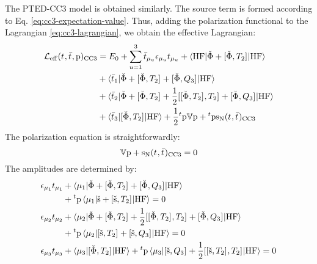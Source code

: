The \acrshort{PTED}-\acrshort{CC3} model is obtained similarly. The
source term is formed according to Eq. \eqref{eq:cc3-expectation-value}.
Thus, adding the polarization functional to the Lagrangian
\eqref{eq:cc3-lagrangian}, we obtain the effective Lagrangian:
\begin{equation}\label{eq:pted-cc3-lagrangian}
  \begin{aligned}
  \mathcal{L}_\mathrm{eff}(t_{}, \bar{t}_{}, \mathrm{p})_\mathrm{CC3}
  &=
  E_0
  + \sum_{u=1}^{3}\bar{t}_{\mu_u}\epsilon_{\mu_u}t_{\mu_u}
  + \braket{\mathrm{HF} | \check{\Phi} + [ \check{\Phi}, T_2 ]^{} | \mathrm{HF}} \\
  &+ \braket{\bar{t}_{1} |
  \check{\Phi} + [ \check{\Phi}, T_2 ]^{} + [ \check{\Phi}, Q_3 ]^{}
  | \mathrm{HF}} \\
  &+ \braket{\bar{t}_{2} |
  \check{\Phi} + [ \check{\Phi}, T_2 ]^{}
  + \frac{1}{2}[ [ \check{\Phi}, T_2 ]^{}, T_2 ]^{} + [ \check{\Phi}, Q_3 ]^{}
  | \mathrm{HF}} \\
  &+ \braket{\bar{t}_{3} | [ \check{\Phi}, T_2 ]^{} | \mathrm{HF}}
  + \frac{1}{2}{}^t\mathrm{p}\mathbb{V}\mathrm{p} +
  {}^t\mathrm{p}\mathrm{s}_{\mathrm{N}}(t_{},\bar{t}_{})_\mathrm{CC3}
  \end{aligned}
\end{equation}
The polarization equation is straightforwardly:
\begin{equation}\label{eq:pted-cc3-polarization}
  \mathbb{V}\mathrm{p} + \mathrm{s}_{\mathrm{N}}(t_{},\bar{t}_{})_\mathrm{CC3} = 0
\end{equation}
The amplitudes are determined by:
\begin{subequations}\label{eq:pted-cc3-amplitudes}
  \begin{align}
    \epsilon_{\mu_1}t_{\mu_1} &+ \braket{\mu_1 |
    \check{\Phi} + [ \check{\Phi}, T_2 ]^{}
    + [ \check{\Phi}, Q_3 ]^{}
    | \mathrm{HF}} \nonumber \\
    &+ {}^t\mathrm{p}\braket{\mu_1 | \check{\mathrm{s}} +
    [ \check{\mathrm{s}}, T_2 ]^{} | \mathrm{HF}}
    = 0 \label{eq:pted-cc3-singles-amplitudes} \\
    \epsilon_{\mu_2}t_{\mu_2} &+ \braket{\mu_2 |
    \check{\Phi} + [ \check{\Phi}, T_2 ]^{}
    + \frac{1}{2}[ [ \check{\Phi}, T_2 ]^{}, T_2 ]^{}
    + [ \check{\Phi}, Q_3 ]^{}
    | \mathrm{HF}} \nonumber  \\
    &+
    {}^t\mathrm{p}\braket{\mu_2 | [ \check{\mathrm{s}}, T_2 ]^{} +
    [ \check{\mathrm{s}}, Q_3 ]^{} | \mathrm{HF}}
    = 0 \label{eq:pted-cc3-doubles-amplitudes} \\
    \epsilon_{\mu_3}t_{\mu_3} &+ \braket{\mu_3 |
    [ \check{\Phi}, T_2 ]^{}
    | \mathrm{HF}}
    + {}^t\mathrm{p}\braket{\mu_3 | [ \check{\mathrm{s}}, Q_3 ]^{}
     + \frac{1}{2}[ [ \check{\mathrm{s}}, T_2 ]^{}, T_2 ]^{}
    | \mathrm{HF}}
    = 0 \label{eq:pted-cc3-triples-amplitudes}
    \end{align}
\end{subequations}
